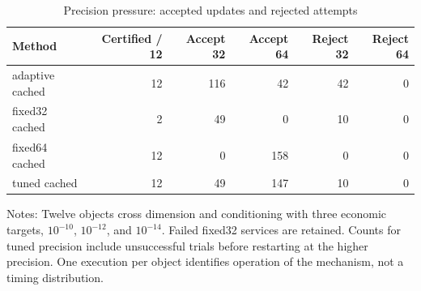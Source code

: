 \begin{table}[htbp]\centering\small
\caption{Precision pressure: accepted updates and rejected attempts}\label{tab:r41precision}
\begin{tabular}{lrrrrr}\toprule
Method & Certified / 12 & Accept 32 & Accept 64 & Reject 32 & Reject 64\\\midrule
adaptive cached & 12 & 116 & 42 & 42 & 0\\
fixed32 cached & 2 & 49 & 0 & 10 & 0\\
fixed64 cached & 12 & 0 & 158 & 0 & 0\\
tuned cached & 12 & 49 & 147 & 10 & 0\\
\bottomrule\end{tabular}
\par\smallskip\begin{minipage}{.97\textwidth}\footnotesize Notes: Twelve objects cross dimension and conditioning with three economic targets, $10^{-10}$, $10^{-12}$, and $10^{-14}$. Failed fixed32 services are retained. Counts for tuned precision include unsuccessful trials before restarting at the higher precision. One execution per object identifies operation of the mechanism, not a timing distribution.\end{minipage}\end{table}
